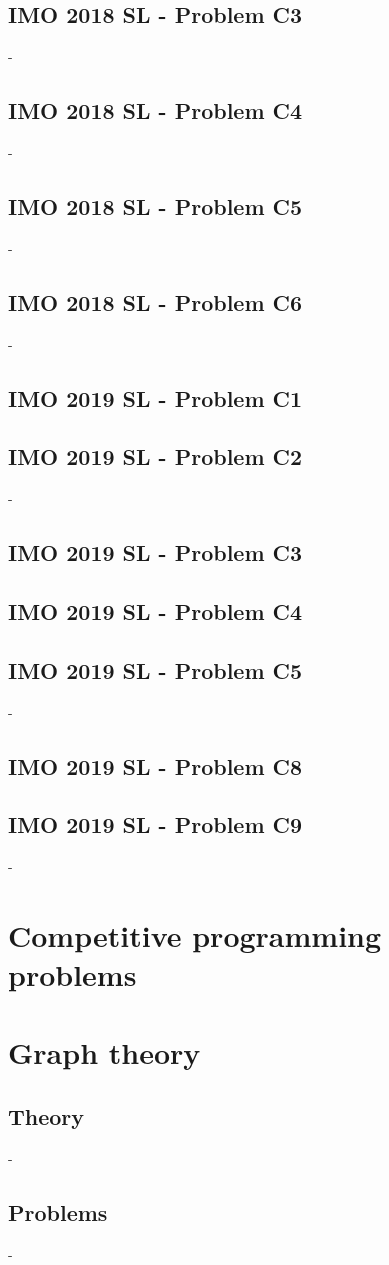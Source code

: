 \documentclass[12pt,openany,oneside]{book}
\theoremstyle{definition}
\numberwithin{definition}{section}
\numberwithin{theorem}{section}
\numberwithin{corollary}{section}
\numberwithin{proposition}{section}
\numberwithin{notation}{section}
\numberwithin{remark}{section}
\numberwithin{hypothesis}{section}
\numberwithin{example}{section}
\begin{document}
\section{IMO 2018 SL - Problem C3}-
\section{IMO 2018 SL - Problem C4}-
\section{IMO 2018 SL - Problem C5}-
\section{IMO 2018 SL - Problem C6}-

\section{IMO 2019 SL - Problem C1}

\section{IMO 2019 SL - Problem C2}-
\section{IMO 2019 SL - Problem C3}

\section{IMO 2019 SL - Problem C4}

\section{IMO 2019 SL - Problem C5}-
\section{IMO 2019 SL - Problem C8}

\section{IMO 2019 SL - Problem C9}-

\chapter{Competitive programming problems}

\chapter{Graph theory}
\section{Theory}-
\section{Problems}-



\end{document}
